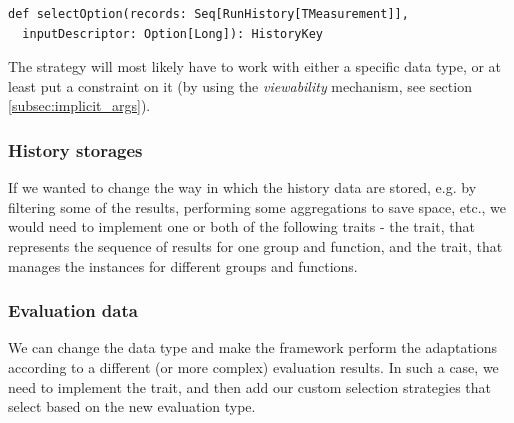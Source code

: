 \lstset{style=Scala}
\begin{lstlisting}
def selectOption(records: Seq[RunHistory[TMeasurement]], 
  inputDescriptor: Option[Long]): HistoryKey
\end{lstlisting}

The strategy will most likely have to work with either a specific  data type, or at least put a constraint on it (by using the \textit{viewability} mechanism, see section \ref{subsec:implicit_args}).

\subsubsection{History storages}

If we wanted to change the way in which the history data are stored, e.g. by filtering some of the results, performing some aggregations to save space, etc., we would need to implement one or both of the following traits - the  trait, that represents the sequence of results for one group and function, and the  trait, that manages the  instances for different groups and functions.

\subsubsection{Evaluation data}

We can change the  data type and make the framework perform the adaptations according to a different (or more complex) evaluation results. In such a case, we need to implement the  trait, and then add our custom selection strategies that select based on the new evaluation type.